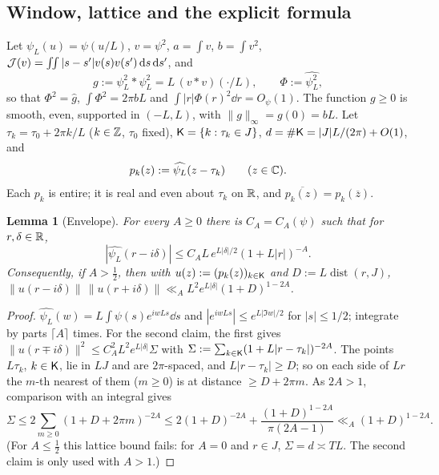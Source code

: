 \documentclass[11pt]{amsart}
\newtheorem{lemma}[theorem]{Lemma}
\theoremstyle{definition}
\theoremstyle{remark}
\numberwithin{equation}{section}
\begin{document}
\subsection{Window, lattice and the explicit formula}\label{sec:explicit}
Let $\psi_L(u)=\psi(u/L)$, $v=\psi^2$, $a=\int v$, $b=\int v^2$, $\mathcal J(v)=\iint|s-s'|v(s)v(s')\,\mathrm d s\,\mathrm d s'$, and
\[
g:=\psi_L^2*\psi_L^2=L\,(v*v)(\cdot/L),\qquad \Phi:=\widehat{\psi_L^2},
\]
so that $\Phi^2=\widehat g$, $\int\Phi^2=2\pi bL$ and $\int|r|\Phi(r)^2\dd r=O_\psi(1)$.
The function $g\ge0$ is smooth, even, supported in $(-L,L)$, with $\|g\|_\infty=g(0)=bL$. Let $\tau_k=\tau_0+2\pi k/L$ ($k\in\mathbb Z$, $\tau_0$ fixed), $\mathsf K=\{k:\tau_k\in J\}$, $d=\#\mathsf K=|J|L/(2\pi)+O(1)$, and
\[
p_k(z):=\widehat{\psi_L}(z-\tau_k)\qquad(z\in\mathbb C).
\]
Each $p_k$ is entire; it is real and even about $\tau_k$ on $\mathbb R$, and $\overline{p_k(z)}=p_k(\overline z)$.

\begin{lemma}[Envelope]\label{lem:envelope}
For every $A\ge0$ there is $C_A=C_A(\psi)$ such that for $r,\delta\in\mathbb R$,
\[
|\widehat{\psi_L}(r-i\delta)|\le C_AL\,e^{L|\delta|/2}(1+L|r|)^{-A}.
\]
Consequently, if $A>\frac12$, then with $u(z):=(p_k(z))_{k\in\mathsf K}$ and $D:=L\operatorname{dist}(r,J)$, $\|u(r-i\delta)\|\,\|u(r+i\delta)\|\ll_AL^2e^{L|\delta|}(1+D)^{1-2A}$.
\end{lemma}
\begin{proof}
$\widehat{\psi_L}(w)=L\int\psi(s)e^{iwLs}\dd s$ and $|e^{iwLs}|\le e^{L|\Im w|/2}$ for $|s|\le1/2$; integrate by parts $\lceil A\rceil$ times. For the second claim, the first gives $\|u(r\mp i\delta)\|^2\le C_A^2L^2e^{L|\delta|}\Sigma$ with $\Sigma:=\sum_{k\in\mathsf K}(1+L|r-\tau_k|)^{-2A}$. The points $L\tau_k$, $k\in\mathsf K$, lie in $LJ$ and are $2\pi$-spaced, and $L|r-\tau_k|\ge D$; so on each side of $Lr$ the $m$-th nearest of them ($m\ge0$) is at distance $\ge D+2\pi m$. As $2A>1$, comparison with an integral gives
\[
\Sigma\le2\sum_{m\ge0}(1+D+2\pi m)^{-2A}\le2(1+D)^{-2A}+\frac{(1+D)^{1-2A}}{\pi(2A-1)}\ll_A(1+D)^{1-2A}.
\]
(For $A\le\frac12$ this lattice bound fails: for $A=0$ and $r\in J$, $\Sigma=d\asymp TL$. The second claim is only used with $A>1$.)
\end{proof}
\end{document}
